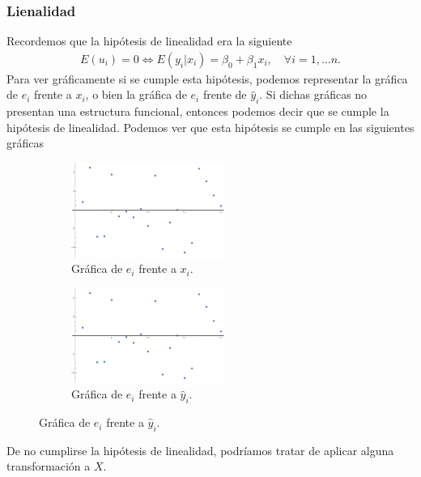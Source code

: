 \subsubsection{Lienalidad}
\noindent Recordemos que la hipótesis de linealidad era la siguiente
\begin{align*}
    E(u_i) = 0 \Longleftrightarrow E(y_i | x_i) = \beta_0 + \beta_1 x_i, \quad \forall i = 1, \dots n.
\end{align*}
Para ver gráficamente si se cumple esta hipótesis, podemos representar la gráfica de $e_i$ frente a $x_i$, o bien la gráfica de $e_i$ frente de $\widehat{y}_i$. Si dichas gráficas no presentan una estructura funcional, entonces podemos decir que se cumple la hipótesis de linealidad. Podemos ver que esta hipótesis se cumple en las siguientes gráficas
\begin{figure}[H]
  \begin{subfigure}[b]{0.55\textwidth}
    \centering
        \includegraphics[width=0.55\textwidth]{imagenes1/linealidadx.png}
        \caption{Gráfica de $e_i$ frente a $x_i$.}
  \end{subfigure}
  \hfill
    \begin{subfigure}[b]{0.55\textwidth}
        \centering
        \includegraphics[width=0.55\textwidth]{imagenes1/linealidadx.png}
        \caption{Gráfica de $e_i$ frente a $\widehat{y}_i$.}
  \end{subfigure}
\end{figure}
\noindent De no cumplirse la hipótesis de linealidad, podríamos tratar de aplicar alguna transformación a $X$.

